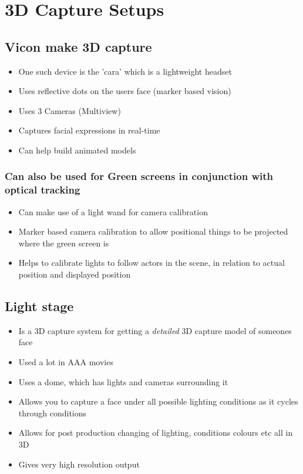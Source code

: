 \documentclass[a4paper]{article}
\begin{document}
\section{3D Capture Setups}
\label{sec-7}
\subsection{Vicon make 3D capture}
\label{sec-7-1}
\begin{itemize}
\item One such device is the 'cara' which is a lightweight headset
\item Uses reflective dots on the users face (marker based vision)
\item Uses 3 Cameras (Multiview)
\item Captures facial expressions in real-time
\item Can help build animated models
\end{itemize}
\subsubsection{Can also be used for Green screens in conjunction with optical tracking}
\label{sec-7-1-1}
\begin{itemize}
\item Can make use of a light wand for camera calibration
\item Marker based camera calibration to allow positional things to be projected where the green screen is
\item Helps to calibrate lights to follow actors in the scene, in relation to actual position and displayed position
\end{itemize}
\subsection{Light stage}
\label{sec-7-2}
\begin{itemize}
\item Is a 3D capture system for getting a \emph{detailed} 3D capture model of someones face
\item Used a lot in AAA movies
\item Uses a dome, which has lights and cameras surrounding it
\item Allows you to capture a face under all possible lighting conditions as it cycles through conditions
\item Allows for post production changing of lighting, conditions colours etc all in 3D
\item Gives very high resolution output
\end{itemize}
\end{document}

